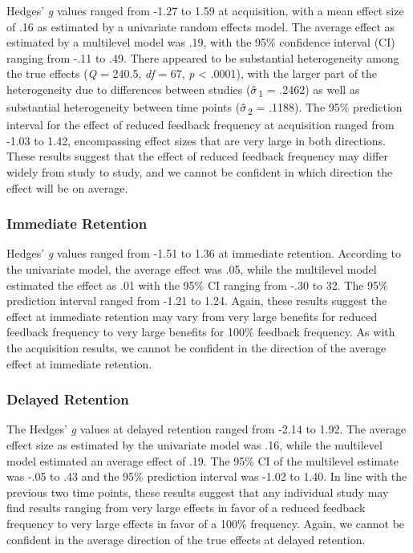 \documentclass[
  english,
  man, donotrepeattitle,floatsintext]{apa7}
\begin{document}
Hedges' \emph{g} values ranged from -1.27 to 1.59 at acquisition, with a mean effect size of .16 as estimated by a univariate random effects model. The average effect as estimated by a multilevel model was .19, with the 95\% confidence interval (CI) ranging from -.11 to .49. There appeared to be substantial heterogeneity among the true effects (\emph{Q} = 240.5, \emph{df} = 67, \emph{p} \textless{} .0001), with the larger part of the heterogeneity due to differences between studies (\(\hat{\small\sigma}\)\textsubscript{1} = .2462) as well as substantial heterogeneity between time points (\(\hat{\small\sigma}\)\textsubscript{2} = .1188). The 95\% prediction interval for the effect of reduced feedback frequency at acquisition ranged from -1.03 to 1.42, encompassing effect sizes that are very large in both directions. These results suggest that the effect of reduced feedback frequency may differ widely from study to study, and we cannot be confident in which direction the effect will be on average.

\hypertarget{immediate-retention}{%
\subsubsection{Immediate Retention}\label{immediate-retention}}

Hedges' \emph{g} values ranged from -1.51 to 1.36 at immediate retention. According to the univariate model, the average effect was .05, while the multilevel model estimated the effect as .01 with the 95\% CI ranging from -.30 to 32. The 95\% prediction interval ranged from -1.21 to 1.24. Again, these results suggest the effect at immediate retention may vary from very large benefits for reduced feedback frequency to very large benefits for 100\% feedback frequency. As with the acquisition results, we cannot be confident in the direction of the average effect at immediate retention.

\hypertarget{delayed-retention}{%
\subsubsection{Delayed Retention}\label{delayed-retention}}

The Hedges' \emph{g} values at delayed retention ranged from -2.14 to 1.92. The average effect size as estimated by the univariate model was .16, while the multilevel model estimated an average effect of .19. The 95\% CI of the multilevel estimate was -.05 to .43 and the 95\% prediction interval was -1.02 to 1.40. In line with the previous two time points, these results suggest that any individual study may find results ranging from very large effects in favor of a reduced feedback frequency to very large effects in favor of a 100\% frequency. Again, we cannot be confident in the average direction of the true effects at delayed retention.
\end{document}
